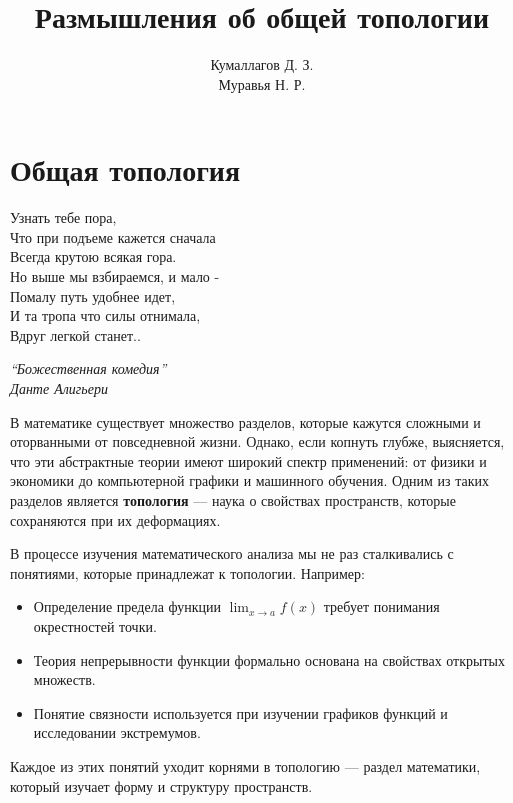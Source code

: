 \documentclass[a4paper, 12pt]{book}
\title{Размышления об общей топологии}
\author{Кумаллагов Д. З. \\ Муравья Н. Р.}
\begin{document}
	
	\renewcommand{\contentsname}{\hfillОГЛАВЛЕНИЕ\hfill} 
	\frontmatter
	\titlepage
	
	\doublespacing
	\tableofcontents
	\let\cleardoublepage\clearpage
	\singlespacing
	
	\mainmatter
	
	\pagestyle{style}
	
	
	\chapter{Общая топология}
	\epigraph{Узнать тебе пора, \\ Что при подъеме кажется сначала \\ Всегда крутою всякая гора. \\ Но выше мы взбираемся, и мало -  \\ Помалу путь удобнее идет,\\ И та тропа что силы отнимала, \\ Вдруг легкой станет..	\leavevmode
	}{\itshape ``Божественная комедия''\\ Данте Алигьери}

В математике существует множество разделов, которые кажутся сложными и оторванными от повседневной жизни. Однако, если копнуть глубже, выясняется, что эти абстрактные теории имеют широкий спектр применений: от физики и экономики до компьютерной графики и машинного обучения. Одним из таких разделов является \textbf{топология} — наука о свойствах пространств, которые сохраняются при их деформациях. 

\bigskip

В процессе изучения математического анализа мы не раз сталкивались с понятиями, которые принадлежат к топологии. Например: 

\begin{itemize}
    \item Определение предела функции \( \displaystyle \lim_{x \to a} f(x) \) требует понимания окрестностей точки.
    \item Теория непрерывности функции формально основана на свойствах открытых множеств.
    \item Понятие связности используется при изучении графиков функций и исследовании экстремумов.
\end{itemize}

Каждое из этих понятий уходит корнями в топологию — раздел математики, который изучает форму и структуру пространств.

\bigskip
\end{document}
